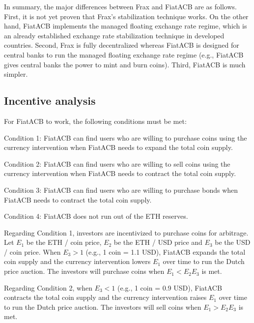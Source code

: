 \documentclass[dvipdfmx,a4paper]{article}
\begin{document}
In summary, the major differences between Frax and FiatACB are as follows. First, it is not yet proven that Frax's stabilization technique works. On the other hand, FiatACB implements the managed floating exchange rate regime, which is an already established exchange rate stabilization technique in developed countries. Second, Frax is fully decentralized whereas FiatACB is designed for central banks to run the managed floating exchange rate regime (e.g., FiatACB gives central banks the power to mint and burn coins). Third, FiatACB is much simpler.

\subsection{Incentive analysis}

For FiatACB to work, the following conditions must be met:

\begin{description}
\item{Condition 1}: FiatACB can find users who are willing to purchase coins using the currency intervention when FiatACB needs to expand the total coin supply.
\item{Condition 2}: FiatACB can find users who are willing to sell coins using the currency intervention when FiatACB needs to contract the total coin supply.
\item{Condition 3}: FiatACB can find users who are willing to purchase bonds when FiatACB needs to contract the total coin supply.
\item{Condition 4}: FiatACB does not run out of the ETH reserves.
\end{description}

Regarding Condition 1, investors are incentivized to purchase coins for arbitrage. Let $E_1$ be the ETH / coin price, $E_2$ be the ETH / USD price and $E_3$ be the USD / coin price. When $E_3>1$ (e.g., 1 coin = 1.1 USD), FiatACB expands the total coin supply and the currency intervention lowers $E_1$ over time to run the Dutch price auction. The investors will purchase coins when $E_1<E_2E_3$ is met.

Regarding Condition 2, when $E_3<1$ (e.g., 1 coin = 0.9 USD), FiatACB contracts the total coin supply and the currency intervention raises $E_1$ over time to run the Dutch price auction. The investors will sell coins when $E_1>E_2E_3$ is met.
\end{document}
